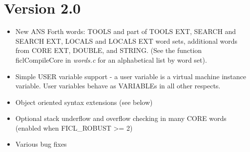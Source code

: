 \section*{Version 2.0}
\begin{itemize}[noitemsep]
	\item New ANS Forth words: TOOLS and part of TOOLS EXT, SEARCH
	and SEARCH EXT, LOCALS and LOCALS EXT word sets, additional
	words from CORE EXT, DOUBLE, and STRING. (See the function
	ficlCompileCore in \textit{words.c} for an alphabetical list by
	word set).

	\item Simple USER variable support - a user variable is a
	virtual machine instance variable. User variables behave as
	VARIABLEs in all other respects.

	\item Object oriented syntax extensions (see below)

	\item Optional stack underflow and overflow checking in many
	CORE words (enabled when FICL\_ROBUST \textgreater = 2)

	\item Various bug fixes
\end{itemize}
